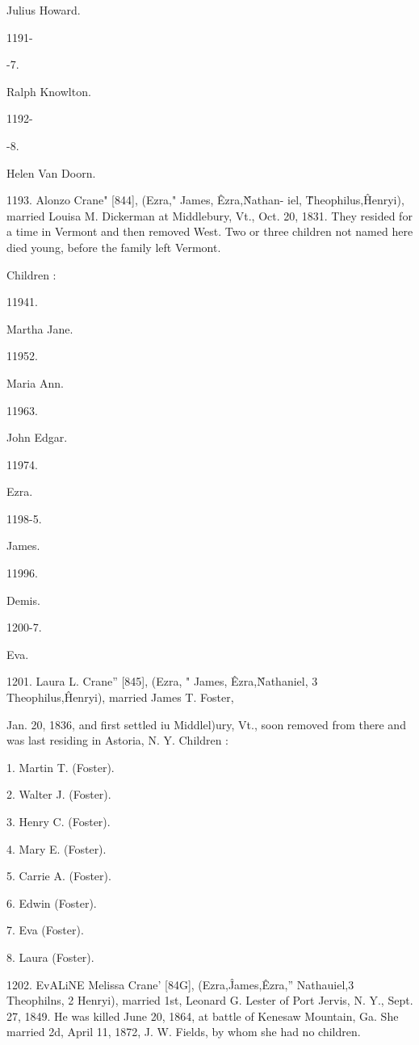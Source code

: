 \documentclass{book}
\begin{document}
Julius Howard. 


1191- 


-7. 


Ralph Knowlton. 


1192- 


-8. 


Helen Van Doorn. 



1193. Alonzo Crane" [844], (Ezra," James, \^ Ezra,\^ Nathan- 
iel, \^ Theophilus,\^ Henryi), married Louisa M. Dickerman at 
Middlebury, Vt., Oct. 20, 1831. They resided for a time in 
Vermont and then removed West. Two or three children not 
named here died young, before the family left Vermont. 

Children : 



11941. 


Martha Jane. 


11952. 


Maria Ann. 


11963. 


John Edgar. 


11974. 


Ezra. 


1198-5. 


James. 


11996. 


Demis. 


1200-7. 


Eva. 



1201. Laura L. Crane'' [845], (Ezra, " James, \^ Ezra,\^ 
Nathaniel, 3 Theophilus,\^ Henryi), married James T. Foster, 




Jan. 20, 1836, and first settled iu Middlel)ury, Vt., soon removed 
from there and was last residing in Astoria, N. Y. Children : 

1. Martin T. (Foster). 

2. Walter J. (Foster). 

3. Henry C. (Foster). 

4. Mary E. (Foster). 

5. Carrie A. (Foster). 

6. Edwin (Foster). 

7. Eva (Foster). 

8. Laura (Foster). 

1202. EvALiNE Melissa Crane' [84G], (Ezra,\^ James,\^ Ezra,'' 
Nathauiel,3 Theophilns, 2 Henryi), married 1st, Leonard G. Lester 
of Port Jervis, N. Y., Sept. 27, 1849. He was killed June 20, 
1864, at battle of Kenesaw Mountain, Ga. She married 2d, 
April 11, 1872, J. W. Fields, by whom she had no children. 
\end{document}
